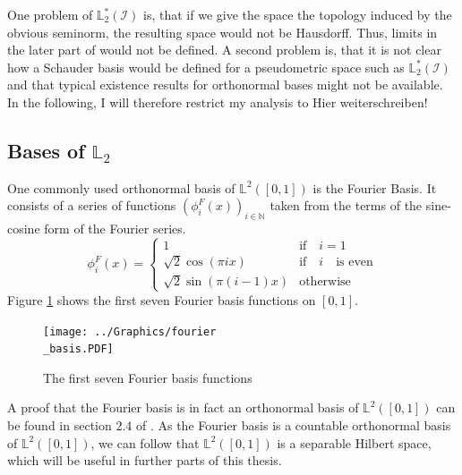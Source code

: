 \documentclass[12pt, a4paper]{article}
\theoremstyle{MAstyle} \newtheorem{assumption}{Assumption}[section]
\theoremstyle{MAstyle} \newtheorem{definition}{Definition}[section]
\begin{document}
			One problem of $\mathbb{L}^{*}_2(\mathcal{I})$ is, that if we give the space the topology induced by the obvious seminorm, the resulting space would not be Hausdorff. Thus, limits in the later part of \cite{bugni_permutation_2021} would not be defined.
			A second problem is, that it is not clear how a Schauder basis would be defined for a pseudometric space such as $\mathbb{L}^{*}_2(\mathcal{I})$ and that typical existence results for orthonormal bases might not be available.\\			
			
			In the following, I will therefore restrict my analysis to {\color{red} Hier weiterschreiben!}

			
			
		\subsection{Bases of $\mathbb{L}_2$}\label{bases_L2}
			
			One commonly used orthonormal basis of $\mathbb{L}^2([0,1])$ is the Fourier Basis. It consists of a series of functions $\left(\phi_{i}^{F}(x)\right)_{i \in \mathbb{N}}$ taken from the terms of the sine-cosine form of the Fourier series.
			\begin{equation}
				\phi_{i}^{F}(x) = 
				\begin{cases}
					1 & \text{if} \quad i = 1\\
					\sqrt{2} \cos(\pi i x) & \text{if} \quad i \quad \text{is even} \\
					\sqrt{2} \sin(\pi (i-1)x) & \text{otherwise}
				\end{cases}
			\end{equation}
			Figure \ref{fourier_basis} shows the first seven Fourier basis functions on $[0,1]$.
			\begin{figure}[H]
				\texttt{[image: ../Graphics/fourier\\\_basis.PDF]}
				\caption{The first seven Fourier basis functions}
				\label{fourier_basis}
			\end{figure}
			A proof that the Fourier basis is in fact an orthonormal basis of $\mathbb{L}^2([0,1])$ can be found in section 2.4 of \cite{hsing_theoretical_2015}. As the Fourier basis is a countable orthonormal basis of $\mathbb{L}^2([0,1])$, we can follow that $\mathbb{L}^2([0,1])$ is a separable Hilbert space, which will be useful in further parts of this thesis.
	
\end{document}
